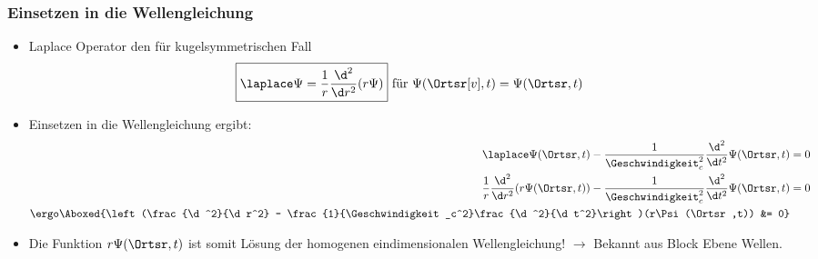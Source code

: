 \begin{frame}
  \frametitle{Einsetzen in die Wellengleichung}
  \begin{itemize}[<+->]
  \item Laplace Operator den für kugelsymmetrischen Fall
    \begin{equation*}
      \boxed{\laplace \Psi= \frac{1}{r}\frac{\d^2}{\d r^2}(r\Psi)} \text{ für } \Psi(\Ortsr[v],t) = \Psi(\Ortsr,t)
    \end{equation*}
  \item Einsetzen in die Wellengleichung ergibt:
    \begin{align*}
      \laplace \Psi(\Ortsr,t) - \frac{1}{\Geschwindigkeit_c^2}\frac{\d^2}{\d t^2}\Psi(\Ortsr,t) &= 0\\
      \frac{1}{r}\frac{\d^2}{\d r^2}(r\Psi(\Ortsr,t)) - \frac{1}{\Geschwindigkeit_c^2}\frac{\d^2}{\d t^2}\Psi(\Ortsr,t) &= 0\\
      \ergo \Aboxed{\left(\frac{\d^2}{\d r^2} - \frac{1}{\Geschwindigkeit_c^2}\frac{\d^2}{\d t^2}\right)(r\Psi(\Ortsr,t)) &= 0} 
    \end{align*}
    \item Die Funktion \alert{\(r\Psi(\Ortsr,t)\)} ist somit Lösung der homogenen eindimensionalen Wellengleichung! \(\to\) Bekannt aus Block \alert{Ebene Wellen}.
  \end{itemize}
  \end{frame}


